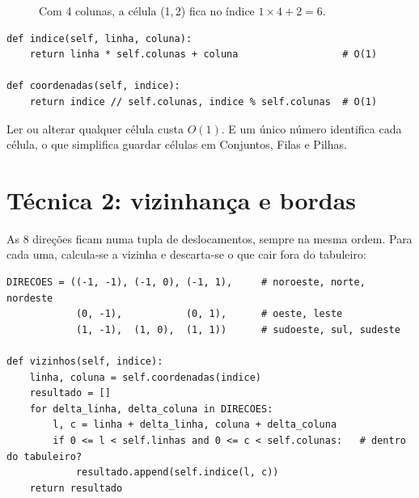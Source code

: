 \begin{figure}[!htb]
\centering
{}
\caption{Com 4 colunas, a célula (1,\,2) fica no índice $1 \times 4 + 2 = 6$.}
\end{figure}

\begin{lstlisting}
def indice(self, linha, coluna):
    return linha * self.colunas + coluna                  # O(1)

def coordenadas(self, indice):
    return indice // self.colunas, indice % self.colunas  # O(1)
\end{lstlisting}

Ler ou alterar qualquer célula custa $O(1)$. E um único número identifica cada célula, o que
simplifica guardar células em Conjuntos, Filas e Pilhas.

\section{Técnica 2: vizinhança e bordas}

As 8 direções ficam numa tupla de deslocamentos, sempre na mesma ordem. Para cada uma, calcula-se
a vizinha e descarta-se o que cair fora do tabuleiro:

\begin{lstlisting}
DIRECOES = ((-1, -1), (-1, 0), (-1, 1),     # noroeste, norte, nordeste
            (0, -1),           (0, 1),      # oeste, leste
            (1, -1),  (1, 0),  (1, 1))      # sudoeste, sul, sudeste

def vizinhos(self, indice):
    linha, coluna = self.coordenadas(indice)
    resultado = []
    for delta_linha, delta_coluna in DIRECOES:
        l, c = linha + delta_linha, coluna + delta_coluna
        if 0 <= l < self.linhas and 0 <= c < self.colunas:   # dentro do tabuleiro?
            resultado.append(self.indice(l, c))
    return resultado
\end{lstlisting}

